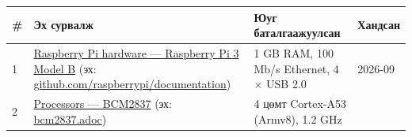 \begingroup\scriptsize\begin{longtable}[]{@{}llll@{}}
\toprule
\begin{minipage}[b]{0.22\columnwidth}\raggedright
\#\strut
\end{minipage} & \begin{minipage}[b]{0.22\columnwidth}\raggedright
Эх сурвалж\strut
\end{minipage} & \begin{minipage}[b]{0.22\columnwidth}\raggedright
Юуг баталгаажуулсан\strut
\end{minipage} & \begin{minipage}[b]{0.22\columnwidth}\raggedright
Хандсан\strut
\end{minipage}\tabularnewline
\midrule
\endhead
\begin{minipage}[t]{0.22\columnwidth}\raggedright
1\strut
\end{minipage} & \begin{minipage}[t]{0.22\columnwidth}\raggedright
\href{https://www.raspberrypi.com/documentation/computers/raspberry-pi.html}{Raspberry Pi hardware --- Raspberry Pi 3 Model B} (эх: \href{https://github.com/raspberrypi/documentation/blob/master/documentation/asciidoc/computers/raspberry-pi/introduction.adoc}{github.\allowbreak{}com/\allowbreak{}raspberrypi/\allowbreak{}documentation})\strut
\end{minipage} & \begin{minipage}[t]{0.22\columnwidth}\raggedright
1 GB RAM, 100 Mb/s Ethernet, 4 × USB 2.0\strut
\end{minipage} & \begin{minipage}[t]{0.22\columnwidth}\raggedright
2026-09\strut
\end{minipage}\tabularnewline
\begin{minipage}[t]{0.22\columnwidth}\raggedright
2\strut
\end{minipage} & \begin{minipage}[t]{0.22\columnwidth}\raggedright
\href{https://www.raspberrypi.com/documentation/computers/processors.html\#bcm2837}{Processors --- BCM2837} (эх: \href{https://github.com/raspberrypi/documentation/blob/master/documentation/asciidoc/computers/processors/bcm2837.adoc}{bcm2837.adoc})\strut
\end{minipage} & \begin{minipage}[t]{0.22\columnwidth}\raggedright
4 цөмт Cortex-A53 (Armv8), 1.2 GHz\strut
\end{minipage} & \begin{minipage}[t]{0.22\columnwidth}\raggedright

\end{minipage}
\end{longtable}

